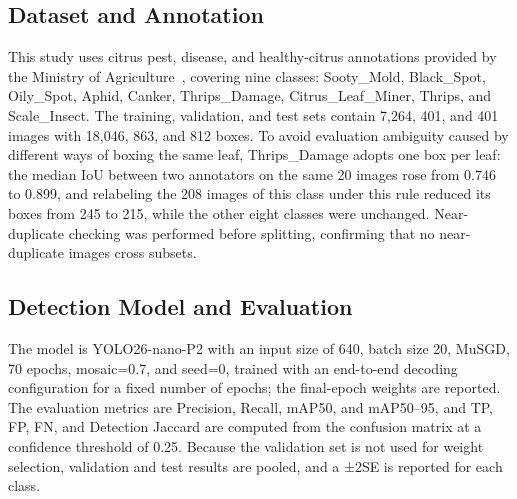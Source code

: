 \documentclass[10pt,twocolumn,a4paper]{article}
\begin{document}
\subsection{Dataset and Annotation}
This study uses citrus pest, disease, and healthy-citrus annotations provided by the Ministry of Agriculture~\cite{moa2026}, covering nine classes: Sooty\_Mold, Black\_Spot, Oily\_Spot, Aphid, Canker, Thrips\_Damage, Citrus\_Leaf\_Miner, Thrips, and Scale\_Insect. The training, validation, and test sets contain 7,264, 401, and 401 images with 18,046, 863, and 812 boxes. To avoid evaluation ambiguity caused by different ways of boxing the same leaf, Thrips\_Damage adopts one box per leaf: the median IoU between two annotators on the same 20 images rose from 0.746 to 0.899, and relabeling the 208 images of this class under this rule reduced its boxes from 245 to 215, while the other eight classes were unchanged. Near-duplicate checking was performed before splitting, confirming that no near-duplicate images cross subsets.

\subsection{Detection Model and Evaluation}
The model is YOLO26-nano-P2 with an input size of 640, batch size 20, MuSGD, 70 epochs, mosaic=0.7, and seed=0, trained with an end-to-end decoding configuration for a fixed number of epochs; the final-epoch weights are reported. The evaluation metrics are Precision, Recall, mAP50, and mAP50–95, and TP, FP, FN, and Detection Jaccard are computed from the confusion matrix at a confidence threshold of 0.25. Because the validation set is not used for weight selection, validation and test results are pooled, and a ±2SE is reported for each class.
\end{document}
